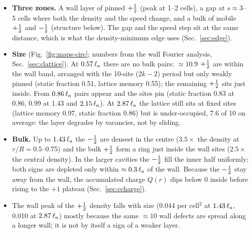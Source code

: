 \begin{itemize}
  \item \textbf{Three zones.} A wall layer of pinned $+\tfrac12$ (peak at 1--2 cells), a gap at $s\approx3$--5 cells where both
        the density and the speed change, and a bulk of mobile $+\tfrac12$ and $-\tfrac12$ (structure below). The gap and the
        speed step sit at the same distance, which is what the density-minimum edge uses (Sec.~\ref{sec:edge}).
  \item \textbf{Size} (Fig.~\ref{fig:maps-circ}; numbers from the wall Fourier analysis, Sec.~\ref{sec:clattice}).
        At $0.57\,\ell_a$ there are no bulk pairs: $\approx10.9$ $+\tfrac12$ are within the wall band, arranged with the 10-site
        ($2k-2$) period but only weakly pinned (static fraction 0.51, lattice memory 0.55); the remaining $+\tfrac12$ sits just
        inside. From $0.86\,\ell_a$ pairs appear and the sites pin (static fraction 0.83 at 0.86, 0.99 at 1.43 and $2.15\,\ell_a$).
        At $2.87\,\ell_a$ the lattice still sits at fixed sites (lattice memory 0.97, static fraction 0.86) but is under-occupied,
        7.6 of 10 on average: the layer degrades by vacancies, not by sliding.
  \item \textbf{Bulk.} Up to $1.43\,\ell_a$ the $-\tfrac12$ are densest in the centre ($3.5\times$ the density at $r/R=0.5$--0.75) and
        the bulk $+\tfrac12$ form a ring just inside the wall sites ($2.5\times$ the central density). In the larger cavities the
        $-\tfrac12$ fill the inner half uniformly; both signs are depleted only within $\approx0.3\,\ell_a$ of the wall. Because the
        $-\tfrac12$ stay away from the wall, the accumulated charge $Q(r)$ dips below 0 inside before rising to the $+1$ plateau
        (Sec.~\ref{sec:ccharge}).
  \item The wall peak of the $+\tfrac12$ density falls with size (0.044 per cell$^2$ at $1.43\,\ell_a$, 0.010 at $2.87\,\ell_a$) mostly
        because the same $\approx10$ wall defects are spread along a longer wall; it is not by itself a sign of a weaker layer.
\end{itemize}

